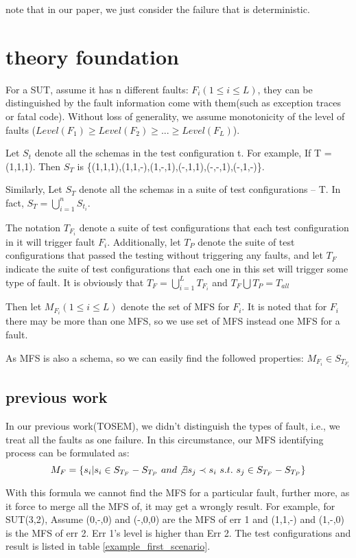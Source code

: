 \documentclass{sig-alternate}
\begin{document}
note that in our paper, we just consider the failure that is deterministic.

\section{theory foundation}
For a SUT, assume it has n different faults: $F_{i} ( 1 \leq i \leq L)$, they can be distinguished by the fault information come with them(such as exception traces or fatal code). Without loss of generality, we assume monotonicity of the level of faults ($Level(F_{1}) \geq Level(F_{2}) \geq ... \geq Level(F_{L}) $).

Let $S_{t}$ denote all the schemas in the test configuration t.  For example, If T = (1,1,1). Then $S_{T}$ is \{(1,1,1),(1,1,-),(1,-,1),(-,1,1),(-,-,1),(-,1,-)\}.

Similarly, Let $S_{T}$ denote all the schemas in a suite of test configurations -- T. In fact, $S_{T} = \bigcup_{i = 1}^{n}S_{t_{i}}$.

The notation $T_{F_{i}}$ denote a suite of test configurations that each test configuration in it will trigger fault $F_{i}$. Additionally, let $T_{P}$ denote the suite of test configurations that passed the testing without triggering any faults, and let $T_{F}$ indicate the suite of test configurations that each one in this set will trigger some type of fault. It is obviously that $T_{F} =  \bigcup_{i = 1}^{L}T_{F_{i}}$ and $T_{F}\bigcup T_{P} = T_{all}$


Then let $ M_{F_{i}} ( 1 \leq i \leq L) $ denote the set of MFS for $F_{i}$. It is noted that for $F_{i}$ there may be more than one MFS, so we use set of MFS instead one MFS for a fault.

As MFS is also a schema, so we can easily find the followed properties:
$ M_{F_{i}} \in S_{T_{F_{i}}} $



\subsection{previous work}

In our previous work(TOSEM), we didn't distinguish the types of fault, i.e., we treat all the faults as one failure. In this circumstance, our MFS identifying process can be formulated as:
$$ M_{F} = \{s_{i} | s_{i} \in S_{T_{F}} - S_{T_{P}}\ and \not\exists s_{j} \prec s_{i}\ s.t.\ s_{j} \in S_{T_{F}} - S_{T_{P}} \}$$

With this formula we cannot find the MFS for a particular fault, further more, as it force to merge all the MFS of, it may get a wrongly result. For example,
for SUT(3,2), Assume (0,-,0) and (-,0,0) are the MFS of err 1 and (1,1,-) and (1,-,0) is the MFS of err 2. Err 1's level is higher than Err 2. The test configurations and result is listed in table \ref{example_first_scenario}.
\end{document}
